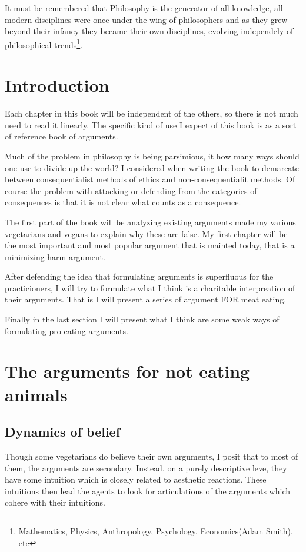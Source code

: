 \documentclass[12pt]{report}
\numberwithin{equation}{section}
\begin{document}
It must be remembered that Philosophy is the generator of all knowledge, all modern disciplines were once under the wing of philosophers and as they grew beyond their infancy they became their own disciplines, evolving independely of philosophical trends\footnote{Mathematics, Physics, Anthropology, Psychology, Economics(Adam Smith), etc}. 


\chapter{Introduction}


Each chapter in this book will be independent of the others, so there is not much need to read it linearly. The specific kind of use I expect of this book is as a sort of reference book of arguments. 

Much of the problem in philosophy is being parsimious, it how many ways should one use to divide up the world? I considered when writing the book to demarcate between consequentialist methods of ethics and non-consequentialit methods. Of course the problem with attacking or defending from the categories of consequences is that it is not clear what counts as a consequence. 

The first part of the book will be analyzing existing arguments made my various vegetarians and vegans to explain why these are false. My first chapter will be the most important and most popular argument that is mainted today, that is a minimizing-harm argument. 

After defending the idea that formulating arguments is superfluous for the practicioners, I will try to formulate what I think is a charitable interpreation of their arguments. That is I will present a series of argument FOR meat eating. 

Finally in the last section I will present what I think are some weak ways of formulating pro-eating arguments. 

\chapter{The arguments for not eating animals}

\section{Dynamics of belief}

Though some vegetarians do believe their own arguments, I posit that to most of them, the arguments are secondary. Instead, on a purely descriptive leve, they have some intuition which is closely related to aesthetic reactions. These intuitions then lead the agents to look for articulations of the arguments which cohere with their intuitions. 
\end{document}
